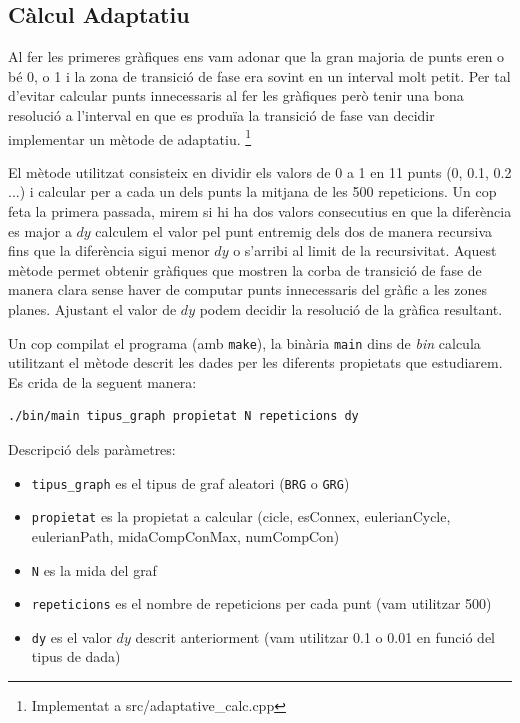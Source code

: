 \subsection{Càlcul Adaptatiu}

Al fer les primeres gràfiques ens vam adonar que la gran majoria de punts eren o bé 0, o 1 i la zona de transició de fase
era sovint en un interval molt petit. Per tal d'evitar calcular punts innecessaris al fer les gràfiques però tenir una
bona resolució a l'interval en que es produïa la transició de fase van decidir implementar un mètode de 
adaptatiu. \footnote{Implementat a src/adaptative\_calc.cpp}

El mètode utilitzat consisteix en dividir els valors de 0 a 1 en 11 punts (0, 0.1, 0.2 ...) i calcular per a cada un dels
punts la mitjana de les 500 repeticions. Un cop feta la primera passada, mirem si hi ha dos valors consecutius en que la
diferència es major a $dy$ calculem el valor pel punt entremig dels dos de manera recursiva fins que la diferència 
sigui menor $dy$ o s'arribi al limit de la recursivitat. Aquest mètode permet obtenir gràfiques que mostren la corba de
transició de fase de manera clara sense haver de computar punts innecessaris del gràfic a les zones planes. Ajustant el valor de $dy$ podem decidir la resolució de la gràfica resultant.

Un cop compilat el programa (amb \texttt{make}), la binària \texttt{main} dins de \emph{bin} calcula utilitzant 
el mètode descrit les dades per les diferents propietats que estudiarem. Es crida de la seguent manera:

\begin{verbatim}
./bin/main tipus_graph propietat N repeticions dy
\end{verbatim}

Descripció dels paràmetres:

\begin{itemize}
    \item  \texttt{tipus\_graph} es el tipus de graf aleatori (\texttt{BRG} o \texttt{GRG})
    \item  \texttt{propietat} es la propietat a calcular (cicle, esConnex, eulerianCycle, eulerianPath, midaCompConMax, numCompCon)
    \item  \texttt{N} es la mida del graf
    \item  \texttt{repeticions} es el nombre de repeticions per cada punt (vam utilitzar 500)
    \item  \texttt{dy} es el valor $dy$ descrit anteriorment (vam utilitzar 0.1 o 0.01 en funció del tipus de dada)
\end{itemize}

